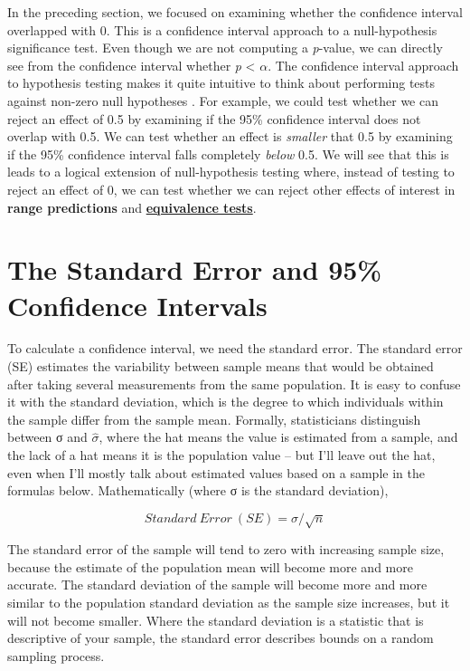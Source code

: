 \documentclass[
]{krantz}
\begin{document}
In the preceding section, we focused on examining whether the confidence interval overlapped with 0. This is a confidence interval approach to a null-hypothesis significance test. Even though we are not computing a \emph{p}-value, we can directly see from the confidence interval whether \emph{p} \textless{} \(\alpha\). The confidence interval approach to hypothesis testing makes it quite intuitive to think about performing tests against non-zero null hypotheses \citep{bauer_unifying_1996}. For example, we could test whether we can reject an effect of 0.5 by examining if the 95\% confidence interval does not overlap with 0.5. We can test whether an effect is \emph{smaller} that 0.5 by examining if the 95\% confidence interval falls completely \emph{below} 0.5. We will see that this is leads to a logical extension of null-hypothesis testing where, instead of testing to reject an effect of 0, we can test whether we can reject other effects of interest in \textbf{range predictions} and \protect\hyperlink{equivalencetest}{\textbf{equivalence tests}}.

\hypertarget{the-standard-error-and-95-confidence-intervals}{%
\section{The Standard Error and 95\% Confidence Intervals}\label{the-standard-error-and-95-confidence-intervals}}

To calculate a confidence interval, we need the standard error. The standard error (SE) estimates the variability between sample means that would be obtained after taking several measurements from the same population. It is easy to confuse it with the standard deviation, which is the degree to which individuals within the sample differ from the sample mean. Formally, statisticians distinguish between σ and \(\widehat{\sigma}\), where the hat means the value is estimated from a sample, and the lack of a hat means it is the population value -- but I'll leave out the hat, even when I'll mostly talk about estimated values based on a sample in the formulas below. Mathematically (where σ is the standard
deviation),

\[
Standard \ Error \ (SE) = \sigma/\sqrt n
\]

The standard error of the sample will tend to zero with increasing sample size, because the estimate of the population mean will become more and more accurate. The standard deviation of the sample will become more and more similar to the population standard deviation as the sample size increases, but it will not become smaller. Where the standard deviation is a statistic that is descriptive of your sample, the standard error describes bounds on a random sampling process.
\end{document}
